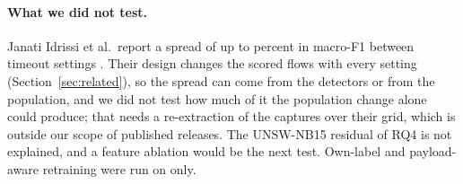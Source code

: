 \paragraph{What we did not test.} Janati Idrissi et al.\ report a spread of up to  percent in macro-F1 between timeout settings \cite{janatiidrissi2025}. Their design changes the scored flows with every setting (Section~\ref{sec:related}), so the spread can come from the detectors or from the population, and we did not test how much of it the population change alone could produce; that needs a re-extraction of the captures over their grid, which is outside our scope of published releases. The UNSW-NB15 residual of RQ4 is not explained, and a feature ablation would be the next test. Own-label and payload-aware retraining were run on \cicids{} only.
